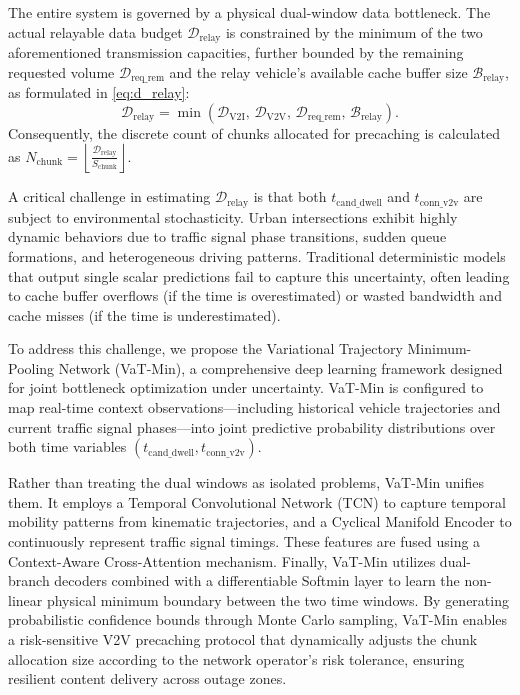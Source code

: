\documentclass[journal]{IEEEtran}
\begin{document}
The entire system is governed by a physical dual-window data bottleneck. The actual relayable data budget $\mathcal{D}_{\text{relay}}$ is constrained by the minimum of the two aforementioned transmission capacities, further bounded by the remaining requested volume $\mathcal{D}_{\text{req\_rem}}$ and the relay vehicle's available cache buffer size $\mathcal{B}_{\text{relay}}$, as formulated in \eqref{eq:d_relay}:
\begin{equation}
\mathcal{D}_{\text{relay}} = \min\left(\mathcal{D}_{\text{V2I}}, \, \mathcal{D}_{\text{V2V}}, \, \mathcal{D}_{\text{req\_rem}}, \, \mathcal{B}_{\text{relay}}\right).
\label{eq:d_relay}
\end{equation}
Consequently, the discrete count of chunks allocated for precaching is calculated as $N_{\text{chunk}} = \left\lfloor \frac{\mathcal{D}_{\text{relay}}}{S_{\text{chunk}}} \right\rfloor$.

A critical challenge in estimating $\mathcal{D}_{\text{relay}}$ is that both $t_{\text{cand\_dwell}}$ and $t_{\text{conn\_v2v}}$ are subject to environmental stochasticity. Urban intersections exhibit highly dynamic behaviors due to traffic signal phase transitions, sudden queue formations, and heterogeneous driving patterns. Traditional deterministic models that output single scalar predictions fail to capture this uncertainty, often leading to cache buffer overflows (if the time is overestimated) or wasted bandwidth and cache misses (if the time is underestimated).

To address this challenge, we propose the Variational Trajectory Minimum-Pooling Network (VaT-Min), a comprehensive deep learning framework designed for joint bottleneck optimization under uncertainty. VaT-Min is configured to map real-time context observations---including historical vehicle trajectories and current traffic signal phases---into joint predictive probability distributions over both time variables $(t_{\text{cand\_dwell}}, t_{\text{conn\_v2v}})$. 

Rather than treating the dual windows as isolated problems, VaT-Min unifies them. It employs a Temporal Convolutional Network (TCN) to capture temporal mobility patterns from kinematic trajectories, and a Cyclical Manifold Encoder to continuously represent traffic signal timings. These features are fused using a Context-Aware Cross-Attention mechanism. Finally, VaT-Min utilizes dual-branch decoders combined with a differentiable Softmin layer to learn the non-linear physical minimum boundary between the two time windows. By generating probabilistic confidence bounds through Monte Carlo sampling, VaT-Min enables a risk-sensitive V2V precaching protocol that dynamically adjusts the chunk allocation size according to the network operator's risk tolerance, ensuring resilient content delivery across outage zones.
\end{document}

